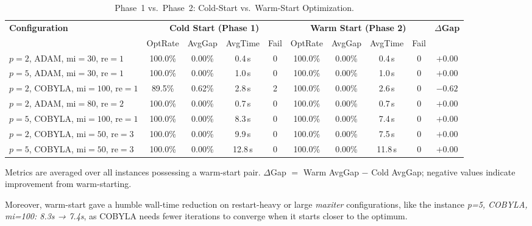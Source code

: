 \documentclass[a4paper]{report}
\begin{document}
{\begin{itemize}
\begin{itemize}
\begin{table}[ht]
\centering
\setlength{\tabcolsep}{4pt}
\begin{tabular}{lcccc|cccc|c}
\toprule
\multirow{2}{*}{\textbf{Configuration}}
  & \multicolumn{4}{c|}{\textbf{Cold Start (Phase 1)}}
  & \multicolumn{4}{c|}{\textbf{Warm Start (Phase 2)}}
  & \multirow{2}{*}{\textbf{$\Delta$Gap}} \\
\cmidrule(lr){2-5}\cmidrule(lr){6-9}
  & OptRate & AvgGap & AvgTime & Fail
  & OptRate & AvgGap & AvgTime & Fail & \\
\midrule
$p{=}2$, ADAM,   mi$=30$, re$=1$ & 100.0\% & 0.00\% & 0.4\,s & 0
                                  & 100.0\% & 0.00\% & 0.4\,s & 0 & $+0.00$ \\
$p{=}5$, ADAM,   mi$=30$, re$=1$ & 100.0\% & 0.00\% & 1.0\,s & 0
                                  & 100.0\% & 0.00\% & 1.0\,s & 0 & $+0.00$ \\
$p{=}2$, COBYLA, mi$=100$, re$=1$ &  89.5\% & 0.62\% & 2.8\,s & 2
                                  & 100.0\% & 0.00\% & 2.6\,s & 0 & $\mathbf{-0.62}$ \\
$p{=}2$, ADAM,   mi$=80$,  re$=2$ & 100.0\% & 0.00\% & 0.7\,s & 0
                                  & 100.0\% & 0.00\% & 0.7\,s & 0 & $+0.00$ \\
$p{=}5$, COBYLA, mi$=100$, re$=1$ & 100.0\% & 0.00\% & 8.3\,s & 0
                                  & 100.0\% & 0.00\% & 7.4\,s & 0 & $+0.00$ \\
$p{=}2$, COBYLA, mi$=50$,  re$=3$ & 100.0\% & 0.00\% & 9.9\,s & 0
                                  & 100.0\% & 0.00\% & 7.5\,s & 0 & $+0.00$ \\
$p{=}5$, COBYLA, mi$=50$,  re$=3$ & 100.0\% & 0.00\% & 12.8\,s & 0
                                  & 100.0\% & 0.00\% & 11.8\,s & 0 & $+0.00$ \\
\bottomrule
\end{tabular}
\caption{Phase~1 vs.\ Phase~2: Cold-Start vs.\ Warm-Start Optimization.}
\label{tab:exp6_phase12}
\end{table}

Metrics are averaged over all instances possessing a warm-start pair. $\Delta$Gap $= $ Warm AvgGap $-$ Cold AvgGap; negative values indicate improvement from warm-starting.

Moreover, warm-start gave a humble wall-time reduction on restart-heavy or large \textit{maxiter} configurations, like the instance \textit{p=5, COBYLA, mi=100: 8.3s → 7.4s}, as COBYLA needs fewer iterations to converge when it starts closer to the optimum.


\end{itemize}
\end{itemize}}
\end{document}
